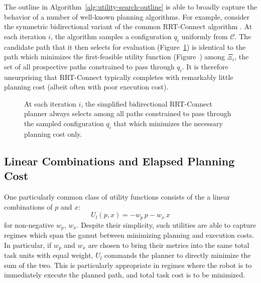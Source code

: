 The outline in Algorithm~\ref{alg:utility-search-outline} is able to
broadly capture the behavior of a number of well-known planning
algorithms.
For example, consider the symmetric bidirectional variant of the
common RRT-Connect algorithm \citep{kuffner2000rrtconnect}.
At each iteration $i$,
the algorithm samples a configuration $q_i$ uniformly from
$\mathcal{C}$.
The candidate path that it then selects for evaluation
(Figure~\ref{fig:rrt})
is identical to the path which minimizes
the first-feasible utility function
(Figure~)
among $\Xi_i$,
the set of all prospective paths constrained to pass through $q_i$.
It is therefore unsurprising that RRT-Connect typically completes
with remarkably little planning cost
(albeit often with poor execution cost).


\begin{figure}
   \centering
   \quad%
   \caption{At each iteration $i$,
      the simplified bidirectional
      RRT-Connect \citep{kuffner2000rrtconnect} planner
      always selects among all paths constrained to pass through
      the sampled configuration $q_i$
      that which minimizes the necessary planning cost only.}
   \label{fig:rrt}
\end{figure}

\subsection{Linear Combinations and Elapsed Planning Cost}

One particularly common class of utility functions consists of the
a linear combinations of $p$ and $x$:
\begin{equation}
   U_l(p,x) = -w_p \, p - w_x \, x
\end{equation}
for non-negative $w_p$, $w_x$.
Despite their simplicity,
such utilities are able to capture regimes
which span the gamut between minimizing planning and execution costs.
In particular,
if $w_p$ and $w_x$ are chosen to bring their metrics into the same
total task units with equal weight,
$U_l$ commands the planner to directly minimize the sum of the two.
This is particularly appropriate in regimes where the robot is to
immediately execute the planned path,
and total task cost is to be minimized.

